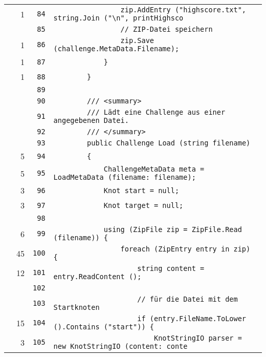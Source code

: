 \documentclass[a4paper,10pt]{article}
\begin{document}
\begin{longtable}[l]{lrrl}
\cellcolor{green} & 1 & \verb~84~ & \verb~                zip.AddEntry ("highscore.txt", string.Join ("\n", printHighsco~\\
\cellcolor{gray} &  & \verb~85~ & \verb~                // ZIP-Datei speichern~\\
\cellcolor{green} & 1 & \verb~86~ & \verb~                zip.Save (challenge.MetaData.Filename);~\\
\cellcolor{green} & 1 & \verb~87~ & \verb~            }~\\
\cellcolor{green} & 1 & \verb~88~ & \verb~        }~\\
\cellcolor{gray} &  & \verb~89~ & \verb~~\\
\cellcolor{gray} &  & \verb~90~ & \verb~        /// <summary>~\\
\cellcolor{gray} &  & \verb~91~ & \verb~        /// Lädt eine Challenge aus einer angegebenen Datei.~\\
\cellcolor{gray} &  & \verb~92~ & \verb~        /// </summary>~\\
\cellcolor{gray} &  & \verb~93~ & \verb~        public Challenge Load (string filename)~\\
\cellcolor{green} & 5 & \verb~94~ & \verb~        {~\\
\cellcolor{green} & 5 & \verb~95~ & \verb~            ChallengeMetaData meta = LoadMetaData (filename: filename);~\\
\cellcolor{green} & 3 & \verb~96~ & \verb~            Knot start = null;~\\
\cellcolor{green} & 3 & \verb~97~ & \verb~            Knot target = null;~\\
\cellcolor{gray} &  & \verb~98~ & \verb~~\\
\cellcolor{green} & 6 & \verb~99~ & \verb~            using (ZipFile zip = ZipFile.Read (filename)) {~\\
\cellcolor{green} & 45 & \verb~100~ & \verb~                foreach (ZipEntry entry in zip) {~\\
\cellcolor{green} & 12 & \verb~101~ & \verb~                    string content = entry.ReadContent ();~\\
\cellcolor{gray} &  & \verb~102~ & \verb~~\\
\cellcolor{gray} &  & \verb~103~ & \verb~                    // für die Datei mit dem Startknoten~\\
\cellcolor{green} & 15 & \verb~104~ & \verb~                    if (entry.FileName.ToLower ().Contains ("start")) {~\\
\cellcolor{green} & 3 & \verb~105~ & \verb~                        KnotStringIO parser = new KnotStringIO (content: conte~\\

\end{longtable}
\end{document}
